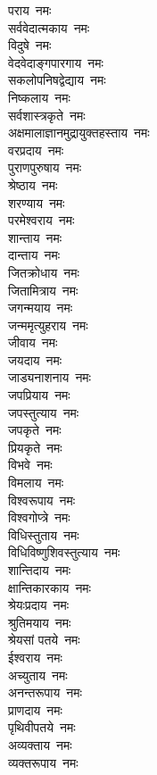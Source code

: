 \begin{flushleft}
\begin{multicols}{2}
पराय~नमः\\
सर्ववेदात्मकाय~नमः\\
विदुषे~नमः\\
वेदवेदाङ्गपारगाय~नमः\\
सकलोपनिषद्वेद्याय~नमः\\
निष्कलाय~नमः\\
सर्वशास्त्रकृते~नमः\\
अक्षमालाज्ञानमुद्रायुक्त\-हस्ताय~नमः\hfill{}\\
वरप्रदाय~नमः\\
पुराणपुरुषाय~नमः\\
श्रेष्ठाय~नमः\\
शरण्याय~नमः\\
परमेश्वराय~नमः\\
शान्ताय~नमः\\
दान्ताय~नमः\\
जितक्रोधाय~नमः\\
जितामित्राय~नमः\\
जगन्मयाय~नमः\hfill{}\\
जन्ममृत्युहराय~नमः\\
जीवाय~नमः\\
जयदाय~नमः\\
जाड्यनाशनाय~नमः\\
जपप्रियाय~नमः\\
जपस्तुत्याय~नमः\\
जपकृते~नमः\\
प्रियकृते~नमः\\
विभवे~नमः\\
विमलाय~नमः\hfill{}\\
विश्वरूपाय~नमः\\
विश्वगोप्त्रे~नमः\\
विधिस्तुताय~नमः\\
विधिविष्णुशिवस्तुत्याय~नमः\\
शान्तिदाय~नमः\\
क्षान्तिकारकाय~नमः\\
श्रेयःप्रदाय~नमः\\
श्रुतिमयाय~नमः\\
श्रेयसां पतये~नमः\\
ईश्वराय~नमः\hfill{}\\
अच्युताय~नमः\\
अनन्तरूपाय~नमः\\
प्राणदाय~नमः\\
पृथिवीपतये~नमः\\
अव्यक्ताय~नमः\\
व्यक्तरूपाय~नमः\\

\end{multicols}
\end{flushleft}
